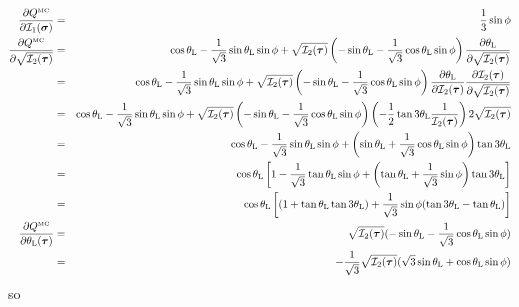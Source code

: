 \begin{eqnarray}
\frac{\partial Q^{\text{\tiny MC}}  }{\partial {\cal I}_1(\bm\sigma)} &=& \frac13 \sin\phi \\
\frac{\partial Q^{\text{\tiny MC}}  }{\partial \sqrt {{\cal I}_2(\bm\tau)}}
&=&  
\cos \theta_{\rm L} - \frac{1}{\sqrt{3}} \sin \theta_{\rm L}  \sin \phi  
+  \sqrt{  {\cal I}_2({\bm \tau})  } 
\left(-\sin \theta_{\rm L} - \frac{1}{\sqrt{3}} \cos \theta_{\rm L}  \sin \phi \right) 
\frac{\partial \theta_{\rm L}}{\partial \sqrt {{\cal I}_2(\bm\tau)}   } \nonumber \\
&=&  
\cos \theta_{\rm L} - \frac{1}{\sqrt{3}} \sin \theta_{\rm L}  \sin \phi  
+  \sqrt{  {\cal I}_2({\bm \tau})  } 
\left(-\sin \theta_{\rm L} - \frac{1}{\sqrt{3}} \cos \theta_{\rm L}  \sin \phi \right) 
\frac{\partial \theta_{\rm L}}{\partial  {{\cal I}_2(\bm\tau)}   }  
\frac{\partial   {{\cal I}_2(\bm\tau)}     }{\partial \sqrt {{\cal I}_2(\bm\tau)}   }  \nonumber\\
&=&  
\cos \theta_{\rm L} - \frac{1}{\sqrt{3}} \sin \theta_{\rm L}  \sin \phi  
+  \sqrt{  {\cal I}_2({\bm \tau})  } 
\left(-\sin \theta_{\rm L} - \frac{1}{\sqrt{3}} \cos \theta_{\rm L}  \sin \phi \right) 
\left(
-\frac12 \tan 3\theta_{\rm L} \frac{1}{ {\cal I}_2(\bm\tau)} 
\right)
2 \sqrt {{\cal I}_2(\bm\tau)} \nonumber \\
&=&  
\cos \theta_{\rm L} - \frac{1}{\sqrt{3}} \sin \theta_{\rm L}  \sin \phi  
+  
\left(\sin \theta_{\rm L} + \frac{1}{\sqrt{3}}\cos\theta_{\rm L}\sin\phi\right) \tan 3\theta_{\rm L} \nonumber\\
&=&  
\cos \theta_{\rm L}
\left[
1 - \frac{1}{\sqrt{3}} \tan \theta_{\rm L}  \sin \phi  
+  
\left(\tan \theta_{\rm L} + \frac{1}{\sqrt{3}}   \sin \phi \right)  \tan 3\theta_{\rm L} 
\right] \nonumber\\
&=&
\cos \theta_{\rm L}
\left[
(1 +  \tan \theta_{\rm L}   \tan 3\theta_{\rm L})
+\frac{1}{\sqrt{3}} \sin\phi
( \tan 3\theta_{\rm L} - \tan\theta_{\rm L})
\right]
\\ 
\frac{\partial Q^{\text{\tiny MC}} }{\partial \theta_{\rm L}(\bm\tau)} 
&=&  
\sqrt{{\cal I}_2(\bm \tau)} (-\sin\theta_{\rm L}-\frac{1}{\sqrt{3}} \cos\theta_{\rm L} \sin\phi )\nonumber\\
&=&  
-\frac{1}{\sqrt{3}} \sqrt{{\cal I}_2(\bm \tau)} (\sqrt{3} \sin\theta_{\rm L}+\cos\theta_{\rm L} \sin\phi )
\end{eqnarray}
so
